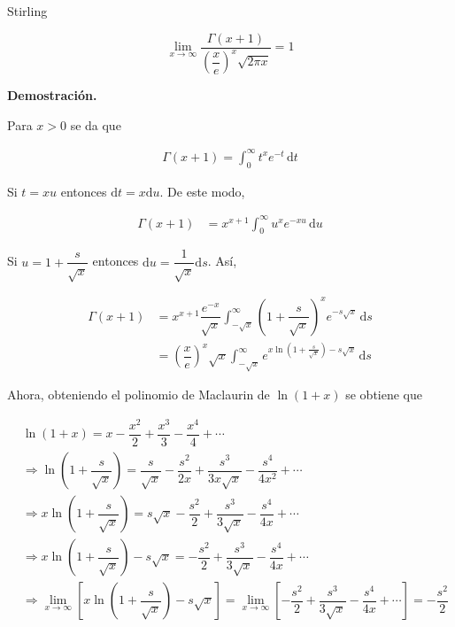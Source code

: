 \documentclass[fleqn]{article}
\newcounter{teore}
\newenvironment{teorema}[2]{\begin{teo}[breakable, pad at break = 5mm, leftrule = 0.7mm, rightrule = 0.7mm, right = 2mm, left = 2mm, enlarge bottom finally by = 3mm, fontupper = \setlength{\parskip}{2mm}, fontlower = \setlength{\parskip}{2mm}]{#1}{#2}}{\end{teo}}
\newcommand{\intg}[4]{\int_{#1}^{#2} \!\! #3 \, \mathrm{d} #4}
\begin{document}
	\begin{teorema}{}{Stirling} 
		\vspace{3mm}

		\begin{equation*}
			\lim_{x \to \infty} \dfrac{\Gamma(x+1)}{\left( \dfrac{x}{e} \right)^x \sqrt{2 \pi x}} = 1
		\end{equation*}
		
		\tcblower

		\textbf{Demostración.}

		Para $ x > 0 $ se da que

		\begin{align*}
			\Gamma(x+1) = \intg{0}{\infty}{t^x e^{-t}}{t}
		\end{align*}

		Si $ t = xu $ entonces $ \mathrm{d} t = x \mathrm{d} u $. De este modo,

		\begin{align*}
			\Gamma(x+1) &= x^{x+1} \intg{0}{\infty}{u^x e^{-xu}}{u}
		\end{align*}

		Si $ u = 1 + \dfrac{s}{\sqrt{x}} $ entonces $ \mathrm{d} u = \dfrac{1}{\sqrt{x}} \mathrm{d} s $. Así,

		\vspace{1mm}

		\begin{align*}
			\Gamma(x+1) &= x^{x+1} \dfrac{e^{-x}}{\sqrt{x}} \intg{-\sqrt{x}}{\infty}{\left( 1 + \dfrac{s}{\sqrt{x}} \right)^x e^{-s \sqrt{x}}}{s} \\
			&= \left( \dfrac{x}{e} \right)^x \sqrt{x} \intg{-\sqrt{x}}{\infty}{e^{x \ln \left( 1 + \frac{s}{\sqrt{x}} \right) - s \sqrt{x}}}{s}
		\end{align*}

		Ahora, obteniendo el polinomio de Maclaurin de $ \ln(1+x) $ se obtiene que

		\begin{align*}
			& \ln (1+x) = x - \dfrac{x^2}{2} + \dfrac{x^3}{3} - \dfrac{x^4}{4} + \cdots \\
			& \Longrightarrow \ln \left( 1 + \dfrac{s}{\sqrt{x}} \right) = \dfrac{s}{\sqrt{x}} - \dfrac{s^2}{2x} + \dfrac{s^3}{3x \sqrt{x}} - \dfrac{s^4}{4x^2} + \cdots \\
			& \Longrightarrow x \ln \left( 1 + \dfrac{s}{\sqrt{x}} \right) = s \sqrt{x} - \dfrac{s^2}{2} + \dfrac{s^3}{3 \sqrt{x}} - \dfrac{s^4}{4x} + \cdots \\
			& \Longrightarrow x \ln \left( 1 + \dfrac{s}{\sqrt{x}} \right) - s \sqrt{x} = - \dfrac{s^2}{2} + \dfrac{s^3}{3 \sqrt{x}} - \dfrac{s^4}{4x} + \cdots \\
			& \Longrightarrow \lim_{x \to \infty} \left[ x \ln \left( 1 + \dfrac{s}{\sqrt{x}} \right) - s \sqrt{x} \right] = \lim_{x \to \infty} \left[ - \dfrac{s^2}{2} + \dfrac{s^3}{3 \sqrt{x}} - \dfrac{s^4}{4x} + \cdots \right] = -\dfrac{s^2}{2} 
		\end{align*}


\end{teorema}
\end{document}
